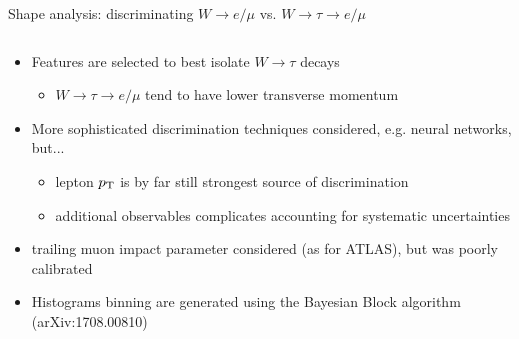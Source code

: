 \begin{frame}{\smaller Shape analysis: discriminating $W\rightarrow e/\mu$ vs. $W\rightarrow\tau\rightarrow e/\mu$}

    \begin{columns}

        \begin{tcolorbox}[]{}
            \begin{itemize}
                \smaller\smaller
                \item Features are selected to best isolate
                    $W\rightarrow\tau$ decays 
                \begin{itemize}
                    \smaller
                    \item \alert{$W\rightarrow\tau\rightarrow e/\mu$ tend to have lower transverse momentum}
                \end{itemize}
                \item More sophisticated discrimination techniques considered, e.g.
                    neural networks, but...
                \begin{itemize}
                    \smaller
                    \item lepton $p_{\mathrm{T}}$ is by far still strongest source
                        of discrimination
                    \item additional observables complicates accounting
                        for systematic uncertainties
                \end{itemize}
                \item trailing muon impact parameter considered (as for ATLAS), but was poorly
                    calibrated
                \item Histograms binning are generated using the Bayesian Block
                     algorithm (arXiv:1708.00810)
            \end{itemize}

        \end{tcolorbox}



\end{columns}
\end{frame}
